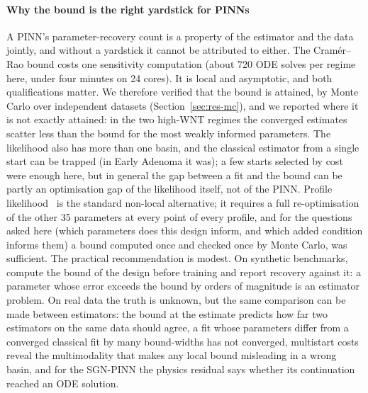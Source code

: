 \paragraph{Why the bound is the right yardstick for PINNs} A PINN's
parameter-recovery count is a property of the estimator and the data jointly,
and without a yardstick it cannot be attributed to either. The Cram\'er--Rao
bound costs one sensitivity computation (about 720 ODE solves per regime here,
under four minutes on 24 cores). It is local and asymptotic, and both qualifications matter. We therefore
verified that the bound is attained, by Monte Carlo over independent datasets
(Section~\ref{sec:res-mc}), and we reported where it is not exactly attained:
in the two high-WNT regimes the converged estimates scatter less than the bound
for the most weakly informed parameters. The likelihood also has more than one
basin, and the classical estimator from a single start can be trapped (in Early
Adenoma it was); a few starts selected by cost were enough here, but in general
the gap between a fit and the bound can be partly an optimisation gap of the
likelihood itself, not of the PINN. Profile likelihood~\citep{raue2009identifiability,kreutz2013profile,simpson2023pwa}
is the standard non-local alternative; it requires a full re-optimisation of the
other 35 parameters at every point of every profile, and for the questions
asked here (which parameters does this design inform, and which added
condition informs them) a bound computed once and checked once by Monte
Carlo, was sufficient. The practical recommendation is modest. On synthetic benchmarks, compute the
bound of the design before training and report recovery against it: a
parameter whose error exceeds the bound by orders of magnitude is an estimator
problem. On real data the truth is unknown, but the same comparison can be made
between estimators: the bound at the estimate predicts how far two estimators
on the same data should agree, a fit whose parameters differ from a converged
classical fit by many bound-widths has not converged, multistart costs reveal
the multimodality that makes any local bound misleading in a wrong basin, and
for the SGN-PINN the physics residual says whether its continuation reached an
ODE solution.

